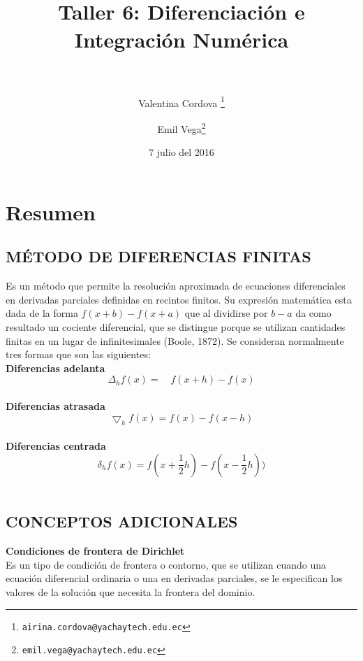 \documentclass[paper=a4, parskip=full, fontsize=12pt]{scrartcl} %
\title{	
\normalfont \normalsize
\horrule{0.5pt} \\[0.4cm] %
\huge Taller 6: Diferenciaci\'on e Integraci\'on Num\'erica \\ %
\horrule{2pt} \\[0.5cm] %
}
\author{Valentina Cordova \thanks{\texttt{airina.cordova@yachaytech.edu.ec}} \and Emil Vega\thanks{\texttt{emil.vega@yachaytech.edu.ec}} }  %
\date{\normalsize 7 julio del 2016} %
\numberwithin{equation}{section} %
\numberwithin{figure}{section} %
\numberwithin{table}{section} %
\begin{document}
\maketitle %






\section{Resumen}
\subsection{M\'ETODO DE DIFERENCIAS FINITAS}

Es un m\'etodo que permite la resoluci\'on aproximada de ecuaciones diferenciales en derivadas parciales definidas en recintos finitos. Su expresi\'on matem\'atica esta dada de la forma $f(x+b) - f(x+a)$ que al dividirse por $b-a$ da como resultado un cociente diferencial, que se distingue porque se utilizan cantidades finitas en un lugar de infinitesimales (Boole, 1872). Se consideran normalmente tres formas que son las siguientes: \\

\textbf{Diferencias adelanta}\\
\begin{equation}
{ \Delta  }_{ h }f\left( x \right) =\quad f(x+h)-f(x)
\end{equation}\\

\textbf{Diferencias atrasada}\\
\begin{equation}
\bigtriangledown_{h} f(x)= f(x)-f(x-h)
\end{equation}\\

\textbf{Diferencias centrada}\\
\begin{equation}
\delta _{h} f(x)= f(x+\frac{1}{2}h)- f(x-\frac{1}{2}h))
\end{equation}\\

\subsection{CONCEPTOS ADICIONALES}
\textbf{Condiciones de frontera de Dirichlet}\\
Es un tipo de condici\'on de frontera o contorno, que se utilizan cuando una ecuaci\'on diferencial ordinaria o una en derivadas parciales, se le especifican los valores de la soluci\'on que necesita la frontera del dominio. \\
\end{document}
